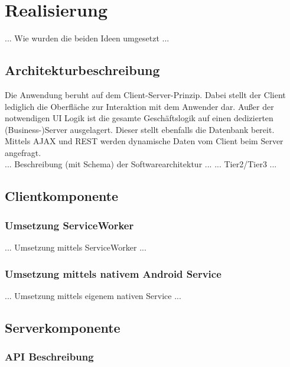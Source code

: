 \section{Realisierung}

... Wie wurden die beiden Ideen umgesetzt ...

\subsection{Architekturbeschreibung}

Die Anwendung beruht auf dem Client-Server-Prinzip. Dabei stellt der Client lediglich die Oberfläche zur Interaktion mit dem Anwender dar. Außer der notwendigen UI Logik ist die gesamte Geschäftslogik auf einen dedizierten (Business-)Server ausgelagert. Dieser stellt ebenfalls die Datenbank bereit. Mittels AJAX und REST werden dynamische Daten vom Client beim Server angefragt.\\

... Beschreibung (mit Schema) der Softwarearchitektur ...
... Tier2/Tier3 ...

\subsection{Clientkomponente}
\subsubsection{Umsetzung ServiceWorker}

... Umsetzung mittels ServiceWorker ...

\subsubsection{Umsetzung mittels nativem Android Service}

... Umsetzung mittels eigenem nativen Service ...


\subsection{Serverkomponente}
\subsubsection{API Beschreibung}

